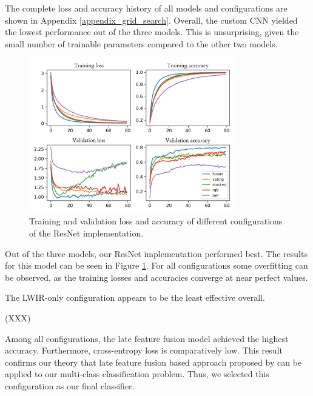 \documentclass{l4proj}
\begin{document}
The complete loss and accuracy history of all models and configurations are shown in Appendix \ref{appendix_grid_search}. Overall, the custom CNN yielded the lowest performance out of the three models. This is unsurprising, given the small number of trainable parameters compared to the other two models.




\begin{figure}[ht]
  \centering
  \includegraphics[width=0.8\textwidth]{images/evaluation/gridsearch/resnet.png}
  \caption{Training and validation loss and accuracy of different configurations of the ResNet implementation.}
  \label{fig:resnet_configs}
\end{figure}

Out of the three models, our ResNet implementation performed best. The results for this model can be seen in Figure \ref{fig:resnet_configs}. For all configurations some overfitting can be observed, as the training losses and accuracies converge at near perfect values.

The LWIR-only configuration appears to be the least effective overall. 

(XXX)

Among all configurations, the late feature fusion model achieved the highest accuracy. Furthermore, cross-entropy loss is comparatively low. This result confirms our theory that late feature fusion based approach proposed by \citet{wagner_multispectral_2016} can be applied to our multi-class classification problem. Thus, we selected this configuration as our final classifier. 
\end{document}
